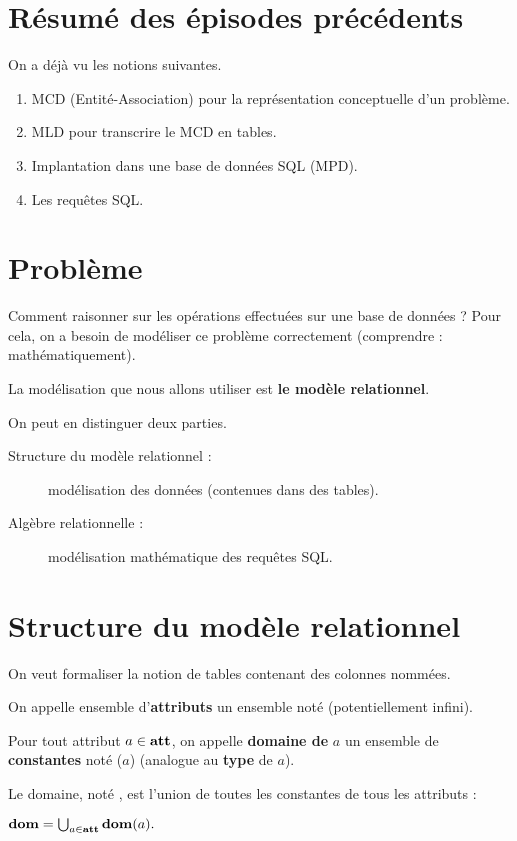 \section{Résumé des épisodes précédents}

On a déjà vu les notions suivantes.
\begin{enumerate}
\item MCD (Entité-Association) pour la représentation conceptuelle d'un problème.
\item MLD pour transcrire le MCD en tables.
\item Implantation dans une base de données SQL (MPD).
\item Les requêtes SQL.
\end{enumerate}


\section{Problème}

Comment raisonner sur les opérations effectuées sur une base de
données ? Pour cela, on a besoin de  modéliser  ce problème correctement
(comprendre : mathématiquement).

La modélisation que nous allons utiliser est \textbf{le modèle relationnel}.

On peut en distinguer deux parties.
\begin{description}
\item[Structure du modèle relationnel :] modélisation des données (contenues dans des tables).
\item[Algèbre relationnelle :] modélisation mathématique des requêtes SQL.
\end{description}

\section{Structure du modèle relationnel}

On veut formaliser la notion de tables contenant des colonnes nommées.

\begin{defi}
  On appelle  ensemble d'\textbf{attributs} un ensemble noté \att{} (potentiellement infini).

  Pour tout attribut $a\in\mathbf{att}$, on appelle \textbf{domaine de }$a$ un ensemble de
  \textbf{constantes} noté \dom($a$) (analogue au \textbf{type} de $a$).


  Le domaine, noté \dom{}, est l'union de toutes les constantes de tous les attributs : 

  $\mathbf{dom} = \bigcup_{a \in \mathbf{att}} \mathbf{dom}(a).$
\end{defi}


